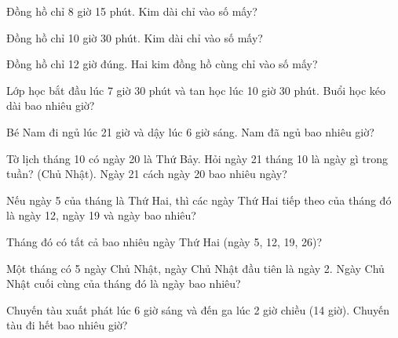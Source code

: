\begin{ex}
Đồng hồ chỉ 8 giờ 15 phút. Kim dài chỉ vào số mấy?
\end{ex}

\begin{ex}
Đồng hồ chỉ 10 giờ 30 phút. Kim dài chỉ vào số mấy?
\end{ex}

\begin{ex}
Đồng hồ chỉ 12 giờ đúng. Hai kim đồng hồ cùng chỉ vào số mấy?
\end{ex}

\begin{ex}
Lớp học bắt đầu lúc 7 giờ 30 phút và tan học lúc 10 giờ 30 phút. Buổi học kéo dài bao nhiêu giờ?
\end{ex}

\begin{ex}
Bé Nam đi ngủ lúc 21 giờ và dậy lúc 6 giờ sáng. Nam đã ngủ bao nhiêu giờ?
\end{ex}

\begin{ex}
Tờ lịch tháng 10 có ngày 20 là Thứ Bảy. Hỏi ngày 21 tháng 10 là ngày gì trong tuần? (Chủ Nhật). Ngày 21 cách ngày 20 bao nhiêu ngày?
\end{ex}

\begin{ex}
Nếu ngày 5 của tháng là Thứ Hai, thì các ngày Thứ Hai tiếp theo của tháng đó là ngày 12, ngày 19 và ngày bao nhiêu?
\end{ex}

\begin{ex}
Tháng đó có tất cả bao nhiêu ngày Thứ Hai (ngày 5, 12, 19, 26)?
\end{ex}

\begin{ex}
Một tháng có 5 ngày Chủ Nhật, ngày Chủ Nhật đầu tiên là ngày 2. Ngày Chủ Nhật cuối cùng của tháng đó là ngày bao nhiêu?
\end{ex}

\begin{ex}
Chuyến tàu xuất phát lúc 6 giờ sáng và đến ga lúc 2 giờ chiều (14 giờ). Chuyến tàu đi hết bao nhiêu giờ?
\end{ex}

